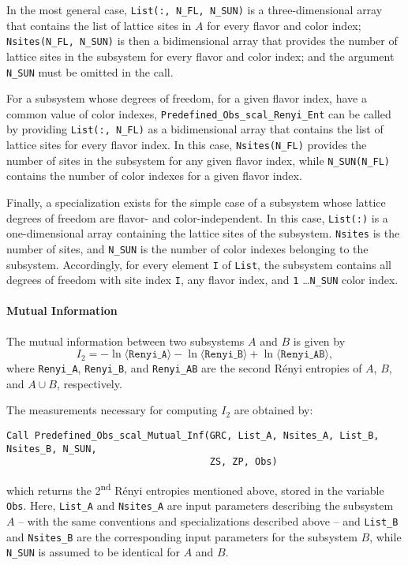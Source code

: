 In the most general case, \texttt{List(:, N\_FL, N\_SUN)} is a three-dimensional array that contains the list of lattice sites in $A$ for every flavor and color index; \texttt{Nsites(N\_FL, N\_SUN)} is then a bidimensional array that provides the number of lattice sites in the subsystem for every flavor and color index; and the argument \texttt{N\_SUN} must be omitted in the call.

For a subsystem whose degrees of freedom, for a given flavor index, have a common value of color indexes, \texttt{Predefined\_Obs\_scal\_Renyi\_Ent} can be called by providing \texttt{List(:, N\_FL)} as a bidimensional array that contains the list of lattice sites for every flavor index. In this case, \texttt{Nsites(N\_FL)} provides the number of sites in the subsystem for any given flavor index, while \texttt{N\_SUN(N\_FL)} contains the number of color indexes for a given flavor index.

Finally, a specialization exists for the simple case of a subsystem whose lattice degrees of freedom are flavor- and color-independent. In this case, \texttt{List(:)} is a one-dimensional array containing the lattice sites of the subsystem. \texttt{Nsites} is the number of sites, and \texttt{N\_SUN} is the number of color indexes belonging to the subsystem.
Accordingly, for every element \texttt{I} of \texttt{List}, the subsystem contains all degrees of freedom with site index \texttt{I}, any flavor index, and \texttt{1} \ldots \texttt{N\_SUN} color index.

\paragraph*{Mutual Information}
The mutual information between two subsystems $A$ and $B$ is given by
\begin{equation}
I_2=-\ln \langle \texttt{Renyi\_A}\rangle -\ln \langle \texttt{Renyi\_B}\rangle +\ln \langle \texttt{Renyi\_AB}\rangle,
\end{equation}
where \texttt{Renyi\_A}, \texttt{Renyi\_B}, and \texttt{Renyi\_AB} are the second R\'enyi entropies of $A$, $B$, and $A\cup B$, respectively.

The measurements necessary for computing $I_2$ are obtained by:
\begin{lstlisting}[style=fortran,breaklines=true]
Call Predefined_Obs_scal_Mutual_Inf(GRC, List_A, Nsites_A, List_B, Nsites_B, N_SUN, 
                                    ZS, ZP, Obs)
\end{lstlisting}
which returns the 2\textsuperscript{nd} R\'enyi entropies mentioned above, stored in the variable \texttt{Obs}. Here, \texttt{List\_A} and \texttt{Nsites\_A} are input parameters describing the subsystem $A$ -- with the same conventions and specializations described above -- and
\texttt{List\_B} and \texttt{Nsites\_B} are the corresponding input parameters for the subsystem $B$, while \texttt{N\_SUN} is assumed to be identical for $A$ and $B$.


